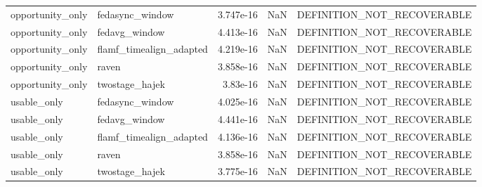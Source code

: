 \begin{tabular}{llrrl}
opportunity_only & fedasync_window & 3.747e-16 & NaN & DEFINITION_NOT_RECOVERABLE \\
opportunity_only & fedavg_window & 4.413e-16 & NaN & DEFINITION_NOT_RECOVERABLE \\
opportunity_only & flamf_timealign_adapted & 4.219e-16 & NaN & DEFINITION_NOT_RECOVERABLE \\
opportunity_only & raven & 3.858e-16 & NaN & DEFINITION_NOT_RECOVERABLE \\
opportunity_only & twostage_hajek & 3.83e-16 & NaN & DEFINITION_NOT_RECOVERABLE \\
usable_only & fedasync_window & 4.025e-16 & NaN & DEFINITION_NOT_RECOVERABLE \\
usable_only & fedavg_window & 4.441e-16 & NaN & DEFINITION_NOT_RECOVERABLE \\
usable_only & flamf_timealign_adapted & 4.136e-16 & NaN & DEFINITION_NOT_RECOVERABLE \\
usable_only & raven & 3.858e-16 & NaN & DEFINITION_NOT_RECOVERABLE \\
usable_only & twostage_hajek & 3.775e-16 & NaN & DEFINITION_NOT_RECOVERABLE \\
\bottomrule
\end{tabular}
